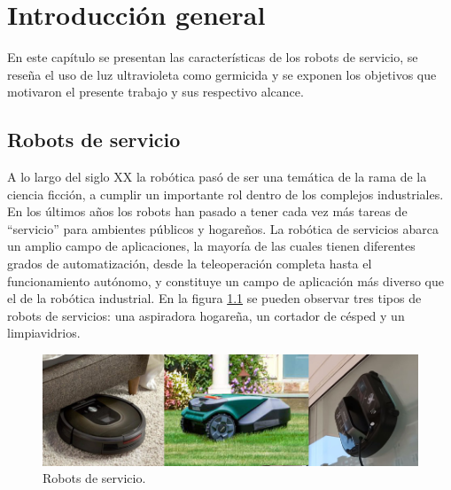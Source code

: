 
\chapter{Introducción general} %

\label{Chapter1} %
\label{IntroGeneral}
En este capítulo se presentan las características de los robots de servicio, se  reseña el uso de luz ultravioleta como germicida y se exponen los objetivos que motivaron el presente trabajo y sus respectivo alcance.

\newcommand{\keyword}[1]{\textbf{#1}}
\newcommand{\tabhead}[1]{\textbf{#1}}
\newcommand{\code}[1]{\texttt{#1}}
\newcommand{\file}[1]{\texttt{\bfseries#1}}
\newcommand{\option}[1]{\texttt{\itshape#1}}
\newcommand{\grados}{$^{\circ}$}



\section{Robots de servicio}

A lo largo del siglo XX la robótica pasó de ser una temática de la rama de la ciencia ficción, a cumplir un importante rol dentro de los complejos industriales. En los últimos años los robots han pasado a tener cada vez más tareas de “servicio” para ambientes  públicos y hogareños.
La robótica de servicios abarca un amplio campo de aplicaciones, la mayoría de las cuales tienen diferentes grados de automatización, desde la teleoperación completa hasta el funcionamiento autónomo, y constituye un campo de aplicación más diverso que el de la robótica industrial. En la  figura \ref{fig:robotsservicio} se pueden observar tres tipos de robots de servicios: una aspiradora hogareña, un cortador de césped y un limpiavidrios.

\begin{figure}[h]
	\centering
	\includegraphics[width=\textwidth]{./Figures/robotsservicio.jpg}
	\caption{Robots de servicio\protect\footnotemark.}
	\label{fig:robotsservicio}
\end{figure}


